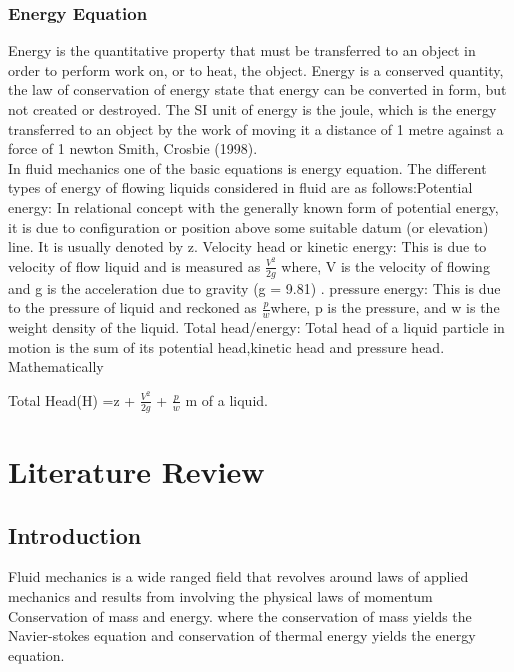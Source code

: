 \documentclass[a4paper, 12pt]{report}
\begin{document}
\subsection{Energy Equation}

Energy is the quantitative property that must be transferred to an object in order to perform work on, or to heat, the object. Energy is a conserved quantity, the law of conservation of energy state that energy can be converted in form, but not created or destroyed. The SI unit of energy is the joule, which is the energy transferred to an object by the work of moving it a distance of 1 metre against a force of 1 newton Smith, Crosbie (1998).\\

In fluid mechanics one of the basic equations is energy equation. The
different types of energy  of flowing liquids considered in fluid are as follows:Potential energy: In relational concept with
the generally known form of potential energy, it is due to configuration
or position above some suitable datum (or elevation) line. It is usually
denoted by z.\newline
Velocity head or kinetic energy: This is due to velocity of flow liquid and is measured as $\frac{V^2}{2g}$  where, V is the velocity of flowing \newline and g is the acceleration due to gravity (g = 9.81) .\newline
pressure energy: This is due to the pressure of liquid and reckoned as
$\frac{p}{w}$where, p is the pressure, and w is the weight density of the liquid.\newline
Total head/energy:
Total head of a liquid particle in motion is the sum of its potential head,kinetic head and pressure head. Mathematically\newline
\begin{center}
	Total Head(H) =z + $\frac{V^2}{2g}$ + $\frac{p}{w}$ m of a liquid.
\end{center}



\pagebreak
\chapter{Literature Review}
\section{Introduction}
Fluid mechanics is a wide ranged field that revolves around laws of applied mechanics and results from involving the physical laws of momentum Conservation of mass and energy. where the conservation of mass yields the Navier-stokes equation and conservation of thermal energy yields the energy equation.
\end{document}
